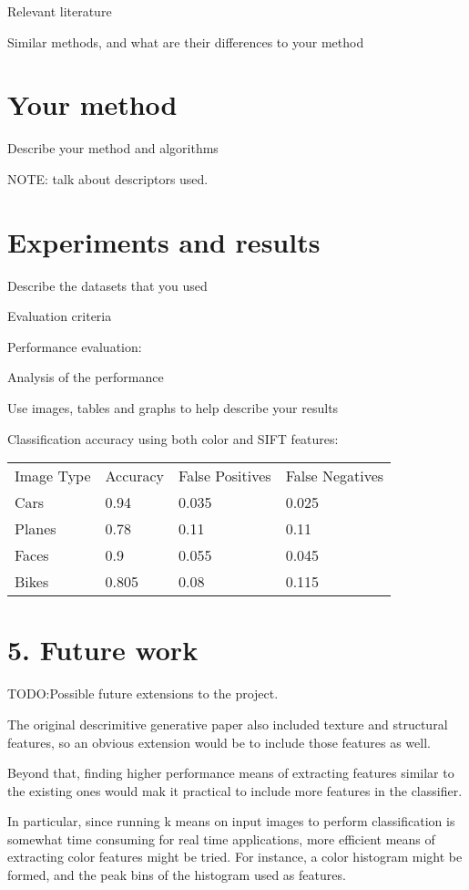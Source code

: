 \documentclass[11pt]{article}
\begin{document}
Relevant literature

Similar methods, and what are their differences to your method

\section{Your method}

Describe your method and algorithms


NOTE: talk about descriptors used.

\section{Experiments and results}

Describe the datasets that you used

Evaluation criteria

Performance evaluation:

Analysis of the performance

Use images, tables and graphs to help describe your results

Classification accuracy using both color and SIFT features:

\begin{tabular}{| l | l | l | l |}
  \hline
  Image Type & Accuracy     & False Positives    & False Negatives \\
  Cars      & 0.94  & 0.035 & 0.025 \\
  Planes    & 0.78  & 0.11  & 0.11  \\
  Faces     & 0.9   & 0.055 & 0.045 \\
  Bikes     & 0.805 & 0.08  & 0.115 \\
  \hline
\end{tabular}


\section{5. Future work}

TODO:Possible future  extensions to the project.

The original descrimitive generative paper also included texture and
structural features, so an obvious extension would be to include those
features as well.

Beyond that, finding higher performance means of extracting features
similar to the existing ones would mak it practical to include more
features in the classifier.

In particular, since running k means on input images to perform
classification is somewhat time consuming for real time applications,
more efficient means of extracting color features might be tried. For
instance, a color histogram might be formed, and the peak bins of the
histogram used as features.
\end{document}
